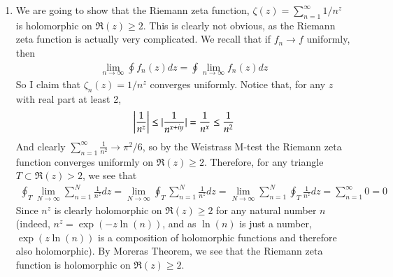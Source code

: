 \documentclass[12pt]{article}
\theoremstyle{definition}
\theoremstyle{remark}
\begin{document}
\begin{enumerate}[leftmargin=\labelsep]
		\item We are going to show that the Riemann zeta function, $\zeta(z) = \sum_{n=1}^\infty 1/n^z$ is holomorphic on $\mathfrak{R}(z) \geq 2$. This is clearly not obvious, as the Riemann zeta function is actually very complicated. We recall that if $f_n \to f$ uniformly, then
		\begin{align*}
			\lim_{n \to \infty} \oint f_n(z)dz = \oint \lim_{n \to \infty} f_n(z)dz
		\end{align*}
		So I claim that $\zeta_n(z) =  1/n^z$ converges uniformly. Notice that, for any $z$ with real part at least 2,
		\begin{align*}
			\qty|\frac{1}{n^z}| \leq |\frac{1}{n^{x+iy}}| = \frac{1}{n^x} \leq \frac{1}{n^2}
		\end{align*}
		And clearly $\sum_{n=1}^\infty \frac{1}{n^2} \to \pi^2/6$, so by the Weistrass M-test the Riemann zeta function converges uniformly on $\mathfrak{R}(z) \geq 2$. Therefore, for any triangle $T \subset \mathfrak{R}(z) > 2$, we see that
		\begin{align*}
			\oint_T \lim_{N \to \infty} \sum_{n=1}^N \frac{1}{n^z}dz = \lim_{N \to \infty} \oint_T \sum_{n=1}^N \frac{1}{n^z}dz = \lim_{N \to \infty} \sum_{n=1}^N \oint_T \frac{1}{n^z}dz = \sum_{n=1}^\infty 0 = 0
		\end{align*}
		Since $n^z$ is clearly holomorphic on $\mathfrak{R}(z) \geq 2$ for any natural number $n$ (indeed, $n^z = \exp(-z\ln(n))$, and as $\ln(n)$ is just a number, $\exp(z\ln(n))$ is a composition of holomorphic functions and therefore also holomorphic). By Moreras Theorem, we see that the Riemann zeta function is holomorphic on $\mathfrak{R}(z) \geq 2$.
	\end{enumerate}
\end{document}
